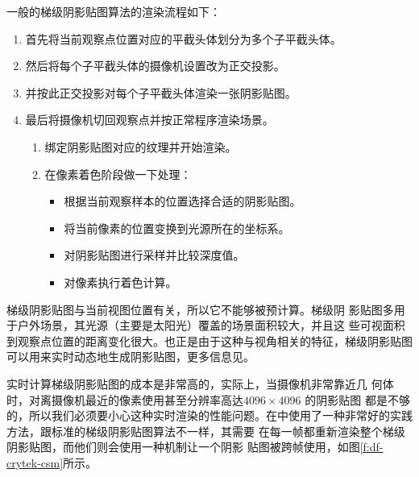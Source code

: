 一般的梯级阴影贴图算法的渲染流程如下：

\begin{enumerate}
	\item 首先将当前观察点位置对应的平截头体划分为多个子平截头体。 
	\item 然后将每个子平截头体的摄像机设置改为正交投影。
	\item 并按此正交投影对每个子平截头体渲染一张阴影贴图。
	\item 最后将摄像机切回观察点并按正常程序渲染场景。
	
	\begin{enumerate}
		\item 绑定阴影贴图对应的纹理并开始渲染。 
		\item 在像素着色阶段做一下处理：
		\begin{itemize}
			\item 根据当前观察样本的位置选择合适的阴影贴图。 
			\item 将当前像素的位置变换到光源所在的坐标系。
			\item 对阴影贴图进行采样并比较深度值。
			\item 对像素执行着色计算。
		\end{itemize}
	\end{enumerate}
\end{enumerate}

梯级阴影贴图与当前视图位置有关，所以它不能够被预计算。梯级阴 影贴图多用于户外场景，其光源（主要是太阳光）覆盖的场景面积较大，并且这 些可视面积到观察点位置的距离变化很大。也正是由于这种与视角相关的特征，梯级阴影贴图可以用来实时动态地生成阴影贴图，更多信息见\cite{m:Cascadedshadowmaps}。

实时计算梯级阴影贴图的成本是非常高的，实际上，当摄像机非常靠近几 何体时，对离摄像机最近的像素使用甚至分辨率高达$ 4096 \times 4096$ 的阴影贴图 都是不够的，所以我们必须要小心这种实时渲染的性能问题。在\cite{a:PlayingwithReal-TimeShadows}中使用了一种非常好的实践方法，跟标准的梯级阴影贴图算法不一样，其需要 在每一帧都重新渲染整个梯级阴影贴图，而他们则会使用一种机制让一个阴影 贴图被跨帧使用，如图\ref{f:df-crytek-csm}所示。

